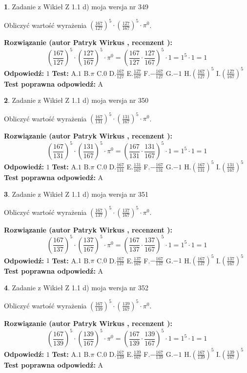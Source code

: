 \documentclass[12pt, a4paper]{article}
\theoremstyle{definition} %
\newtheorem{zad}{}
\newcommand{\zadStart}[1]{\begin{zad}#1\newline}
\newcommand{\zadStop}{\end{zad}}
\newcommand{\rozwStart}[2]{\noindent \textbf{Rozwiązanie (autor #1 , recenzent #2): }\newline}
\newcommand{\rozwStop}{\newline}
\newcommand{\odpStart}{\noindent \textbf{Odpowiedź:}\newline}
\newcommand{\odpStop}{\newline}
\newcommand{\testStart}{\noindent \textbf{Test:}\newline}
\newcommand{\testStop}{\newline}
\newcommand{\kluczStart}{\noindent \textbf{Test poprawna odpowiedź:}\newline}
\newcommand{\kluczStop}{\newline}
\begin{document}
\zadStart{Zadanie z Wikieł Z 1.1 d) moja wersja nr 349}

Obliczyć wartość wyrażenia $(\frac{167}{127})^{5} \cdot (\frac{127}{167})^{5} \cdot \pi^{0}$.
\zadStop
\rozwStart{Patryk Wirkus}{}
$$(\frac{167}{127})^{5} \cdot (\frac{127}{167})^{5} \cdot \pi^{0} = (\frac{167}{127} \cdot \frac{127}{167})^{5} \cdot 1 = 1^{5} \cdot 1 = 1$$
\rozwStop
\odpStart
$1$
\odpStop
\testStart
A.$1$ B.$\pi$ C.$0$ D.$\frac{167}{127}$ E.$\frac{127}{167}$
F.$-\frac{167}{127}$ G.$-1$
H.$(\frac{167}{127})^{5}$
I.$(\frac{127}{167})^{5}$
\testStop
\kluczStart
A
\kluczStop



\zadStart{Zadanie z Wikieł Z 1.1 d) moja wersja nr 350}

Obliczyć wartość wyrażenia $(\frac{167}{131})^{5} \cdot (\frac{131}{167})^{5} \cdot \pi^{0}$.
\zadStop
\rozwStart{Patryk Wirkus}{}
$$(\frac{167}{131})^{5} \cdot (\frac{131}{167})^{5} \cdot \pi^{0} = (\frac{167}{131} \cdot \frac{131}{167})^{5} \cdot 1 = 1^{5} \cdot 1 = 1$$
\rozwStop
\odpStart
$1$
\odpStop
\testStart
A.$1$ B.$\pi$ C.$0$ D.$\frac{167}{131}$ E.$\frac{131}{167}$
F.$-\frac{167}{131}$ G.$-1$
H.$(\frac{167}{131})^{5}$
I.$(\frac{131}{167})^{5}$
\testStop
\kluczStart
A
\kluczStop



\zadStart{Zadanie z Wikieł Z 1.1 d) moja wersja nr 351}

Obliczyć wartość wyrażenia $(\frac{167}{137})^{5} \cdot (\frac{137}{167})^{5} \cdot \pi^{0}$.
\zadStop
\rozwStart{Patryk Wirkus}{}
$$(\frac{167}{137})^{5} \cdot (\frac{137}{167})^{5} \cdot \pi^{0} = (\frac{167}{137} \cdot \frac{137}{167})^{5} \cdot 1 = 1^{5} \cdot 1 = 1$$
\rozwStop
\odpStart
$1$
\odpStop
\testStart
A.$1$ B.$\pi$ C.$0$ D.$\frac{167}{137}$ E.$\frac{137}{167}$
F.$-\frac{167}{137}$ G.$-1$
H.$(\frac{167}{137})^{5}$
I.$(\frac{137}{167})^{5}$
\testStop
\kluczStart
A
\kluczStop



\zadStart{Zadanie z Wikieł Z 1.1 d) moja wersja nr 352}

Obliczyć wartość wyrażenia $(\frac{167}{139})^{5} \cdot (\frac{139}{167})^{5} \cdot \pi^{0}$.
\zadStop
\rozwStart{Patryk Wirkus}{}
$$(\frac{167}{139})^{5} \cdot (\frac{139}{167})^{5} \cdot \pi^{0} = (\frac{167}{139} \cdot \frac{139}{167})^{5} \cdot 1 = 1^{5} \cdot 1 = 1$$
\rozwStop
\odpStart
$1$
\odpStop
\testStart
A.$1$ B.$\pi$ C.$0$ D.$\frac{167}{139}$ E.$\frac{139}{167}$
F.$-\frac{167}{139}$ G.$-1$
H.$(\frac{167}{139})^{5}$
I.$(\frac{139}{167})^{5}$
\testStop
\kluczStart
A
\kluczStop
\end{document}
